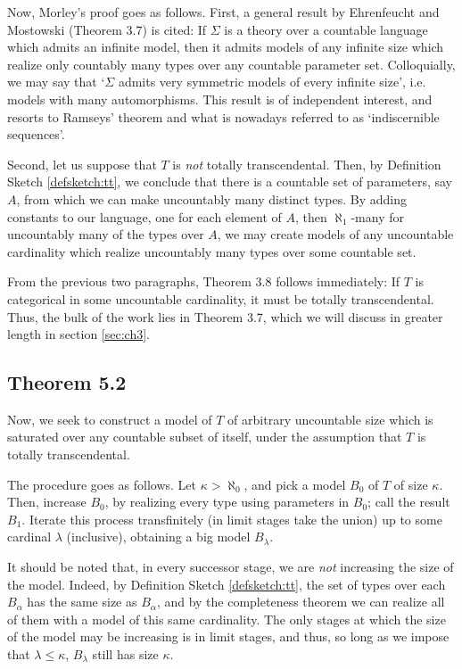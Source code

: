 \documentclass{article}
\theoremstyle{nonumberplain}
\begin{document}
Now, Morley's proof goes as follows. First, a general result by Ehrenfeucht and Mostowski (Theorem 3.7) is cited: If $\Sigma$ is a theory over a countable language which admits an infinite model, then it admits models of any infinite size which realize only countably many types over any countable parameter set. Colloquially, we may say that `$\Sigma$ admits very symmetric models of every infinite size', i.e. models with many automorphisms. This result is of independent interest, and resorts to Ramseys' theorem and what is nowadays referred to as `indiscernible sequences'.

Second, let us suppose that $T$ is \emph{not} totally transcendental. Then, by Definition Sketch \ref{defsketch:tt}, we conclude that there is a countable set of parameters, say $A$, from which we can make uncountably many distinct types. By adding constants to our language, one for each element of $A$, then $\aleph_1$-many for uncountably many of the types over $A$, we may create models of any uncountable cardinality which realize uncountably many types over some countable set.

From the previous two paragraphs, Theorem 3.8 follows immediately: If $T$ is categorical in some uncountable cardinality, it must be totally transcendental. Thus, the bulk of the work lies in Theorem 3.7, which we will discuss in greater length in section \ref{sec:ch3}.

\subsection{Theorem 5.2}

Now, we seek to construct a model of $T$ of arbitrary uncountable size which is saturated over any countable subset of itself, under the assumption that $T$ is totally transcendental.

The procedure goes as follows. Let $\kappa > \aleph_0$, and pick a model $B_0$ of $T$ of size $\kappa$. Then, increase $B_0$, by realizing every type using parameters in $B_0$; call the result $B_1$. Iterate this process transfinitely (in limit stages take the union) up to some cardinal $\lambda$ (inclusive), obtaining a big model $B_\lambda$.

It should be noted that, in every successor stage, we are \emph{not} increasing the size of the model. Indeed, by Definition Sketch \ref{defsketch:tt}, the set of types over each $B_\alpha$ has the same size as $B_\alpha$, and by the completeness theorem we can realize all of them with a model of this same cardinality. The only stages at which the size of the model may be increasing is in limit stages, and thus, so long as we impose that $\lambda \leq \kappa$, $B_\lambda$ still has size $\kappa$.
\end{document}
